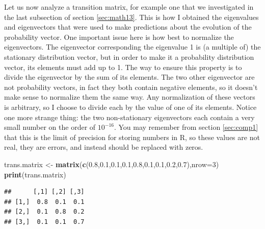\documentclass[
]{book}
\newenvironment{Shaded}{\begin{snugshade}}{\end{snugshade}}
\newcommand{\DataTypeTok}[1]{\textcolor[rgb]{0.13,0.29,0.53}{#1}}
\newcommand{\DecValTok}[1]{\textcolor[rgb]{0.00,0.00,0.81}{#1}}
\newcommand{\FloatTok}[1]{\textcolor[rgb]{0.00,0.00,0.81}{#1}}
\newcommand{\KeywordTok}[1]{\textcolor[rgb]{0.13,0.29,0.53}{\textbf{#1}}}
\newcommand{\NormalTok}[1]{#1}
\newcommand{\OperatorTok}[1]{\textcolor[rgb]{0.81,0.36,0.00}{\textbf{#1}}}
\newcommand{\StringTok}[1]{\textcolor[rgb]{0.31,0.60,0.02}{#1}}
\theoremstyle{definition}
\theoremstyle{definition}
\theoremstyle{definition}
\theoremstyle{remark}
\begin{document}
Let us now analyze a transition matrix, for example one that we investigated in the last subsection of section \ref{sec:math13}. This is how I obtained the eigenvalues and eigenvectors that were used to make predictions about the evolution of the probability vector. One important issue here is how best to normalize the eigenvectors. The eigenvector corresponding the eigenvalue 1 is (a multiple of) the stationary distribution vector, but in order to make it a probability distribution vector, its elements must add up to 1. The way to ensure this property is to divide the eigenvector by the sum of its elements. The two other eigenvector are not probability vectors, in fact they both contain negative elements, so it doesn't make sense to normalize them the same way. Any normalization of these vectors is arbitrary, so I choose to divide each by the value of one of its elements. Notice one more strange thing: the two non-stationary eigenvectors each contain a very small number on the order of \(10^{-16}\). You may remember from section \ref{sec:comp1} that this is the limit of precision for storing numbers in R, so these values are not real, they are errors, and instead should be replaced with zeros.

\begin{Shaded}
\begin{Highlighting}[]
\NormalTok{trans.matrix \textless{}{-}}\StringTok{ }\KeywordTok{matrix}\NormalTok{(}\KeywordTok{c}\NormalTok{(}\FloatTok{0.8}\NormalTok{,}\FloatTok{0.1}\NormalTok{,}\FloatTok{0.1}\NormalTok{,}\FloatTok{0.1}\NormalTok{,}\FloatTok{0.8}\NormalTok{,}\FloatTok{0.1}\NormalTok{,}\FloatTok{0.1}\NormalTok{,}\FloatTok{0.2}\NormalTok{,}\FloatTok{0.7}\NormalTok{),}\DataTypeTok{nrow=}\DecValTok{3}\NormalTok{)}
\KeywordTok{print}\NormalTok{(trans.matrix)}
\end{Highlighting}
\end{Shaded}

\begin{verbatim}
##      [,1] [,2] [,3]
## [1,]  0.8  0.1  0.1
## [2,]  0.1  0.8  0.2
## [3,]  0.1  0.1  0.7
\end{verbatim}

\begin{Shaded}
\end{Shaded}
\end{document}
